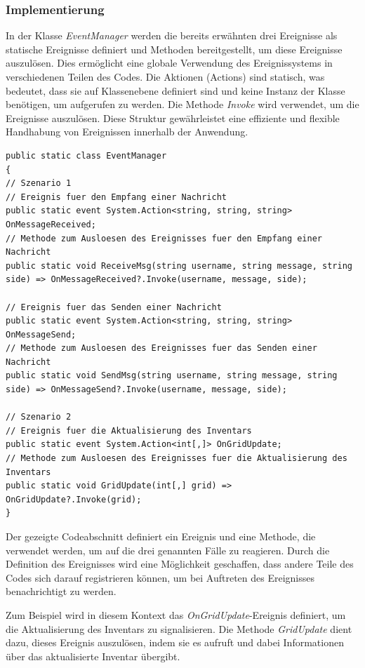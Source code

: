 \subsubsection*{Implementierung}

In der Klasse \textit{EventManager} werden die bereits erwähnten drei Ereignisse als statische Ereignisse definiert und Methoden bereitgestellt, um diese Ereignisse auszulösen. Dies ermöglicht eine globale Verwendung des Ereignissystems in verschiedenen Teilen des Codes. Die Aktionen (Actions) sind statisch, was bedeutet, dass sie auf Klassenebene definiert sind und keine Instanz der Klasse benötigen, um aufgerufen zu werden. Die Methode \textit{Invoke} wird verwendet, um die Ereignisse auszulösen. Diese Struktur gewährleistet eine effiziente und flexible Handhabung von Ereignissen innerhalb der Anwendung.

\begin{lstlisting}[style=csharp, label=code:EventManager]
public static class EventManager
{
// Szenario 1
// Ereignis fuer den Empfang einer Nachricht
public static event System.Action<string, string, string> OnMessageReceived;
// Methode zum Ausloesen des Ereignisses fuer den Empfang einer Nachricht
public static void ReceiveMsg(string username, string message, string side) => OnMessageReceived?.Invoke(username, message, side);

// Ereignis fuer das Senden einer Nachricht
public static event System.Action<string, string, string> OnMessageSend;
// Methode zum Ausloesen des Ereignisses fuer das Senden einer Nachricht
public static void SendMsg(string username, string message, string side) => OnMessageSend?.Invoke(username, message, side);

// Szenario 2
// Ereignis fuer die Aktualisierung des Inventars
public static event System.Action<int[,]> OnGridUpdate;
// Methode zum Ausloesen des Ereignisses fuer die Aktualisierung des Inventars
public static void GridUpdate(int[,] grid) => OnGridUpdate?.Invoke(grid);
}
\end{lstlisting}

Der gezeigte Codeabschnitt definiert ein Ereignis und eine Methode, die verwendet werden, um auf die drei genannten Fälle zu reagieren. Durch die Definition des Ereignisses wird eine Möglichkeit geschaffen, dass andere Teile des Codes sich darauf registrieren können, um bei Auftreten des Ereignisses benachrichtigt zu werden.

Zum Beispiel wird in diesem Kontext das \textit{OnGridUpdate}-Ereignis definiert, um die Aktualisierung des Inventars zu signalisieren. Die Methode \textit{GridUpdate} dient dazu, dieses Ereignis auszulösen, indem sie es aufruft und dabei Informationen über das aktualisierte Inventar übergibt.

